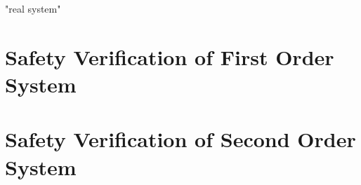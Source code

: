 "real system"

\section{Safety Verification of First Order System}

\section{Safety Verification of Second Order System}